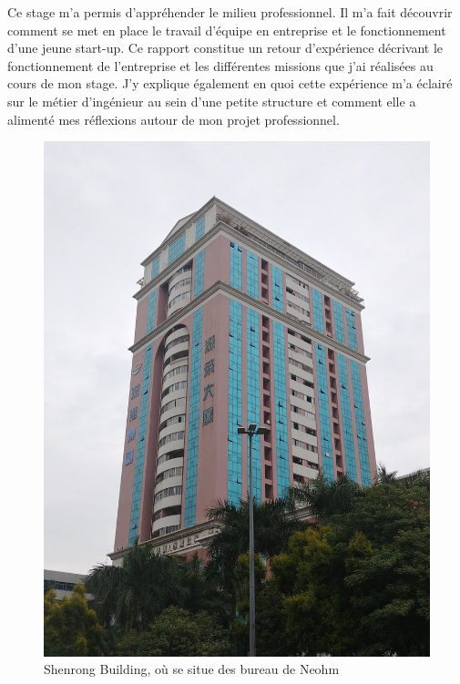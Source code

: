 \documentclass[a4paper, 12pt, sffamily]{report}
\begin{document}
Ce stage m’a permis d’appréhender le milieu professionnel. Il m’a fait découvrir comment se met en place le travail d'équipe en entreprise et le fonctionnement d'une jeune start-up. Ce rapport constitue un retour d’expérience décrivant le fonctionnement de l’entreprise et les différentes missions que j’ai réalisées au cours de mon stage. J'y explique également en quoi cette expérience m’a éclairé sur le métier d’ingénieur au sein d’une petite structure et comment elle a alimenté mes réflexions autour de mon projet professionnel.

\begin{figure}
\centering
\includegraphics[scale=0.15]{figures/photos/photo_building.jpg}
\caption{Shenrong Building, où se situe des bureau de Neohm}
\label{fig:photo_building}
\end{figure}
\end{document}
